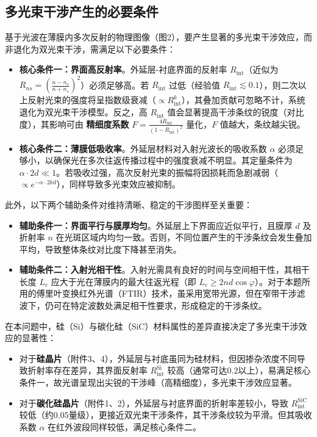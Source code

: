 \documentclass{ctexart} %
\begin{document}
\subsection{多光束干涉产生的必要条件}
基于光波在薄膜内多次反射的物理图像（图2），要产生显著的多光束干涉效应，而非退化为双光束干涉，需满足以下必要条件：

\begin{itemize}
    \item \textbf{核心条件一：界面高反射率}。外延层-衬底界面的反射率 $R_{\text{int}}$（近似为 $R_{ns} = \left( \frac{n - n_s}{n + n_s} \right)^2$）必须足够高。若 $R_{\text{int}}$ 过低（经验值 $R_{\text{int}} \lesssim 0.1$），则二次以上反射光束的强度将呈指数级衰减（$\propto R_{\text{int}}^k$），其叠加贡献可忽略不计，系统退化为双光束干涉模型。反之，高 $R_{\text{int}}$ 值会显著提高干涉条纹的锐度（对比度），其影响可由 \textbf{精细度系数} $F = \frac{4R_{\text{int}}}{(1-R_{\text{int}})^2}$ 量化，$F$ 值越大，条纹越尖锐。

    \item \textbf{核心条件二：薄膜低吸收率}。外延层材料对入射光波长的吸收系数 $\alpha$ 必须足够小，以确保光在多次往返传播过程中的强度衰减不明显。其定量条件为 $\alpha \cdot 2d \ll 1$。若吸收过强，高次反射光束的振幅将因损耗而急剧减弱（$\propto e^{-\alpha \cdot 2k d}$），同样导致多光束效应被抑制。
\end{itemize}

\noindent 此外，以下两个辅助条件对维持清晰、稳定的干涉图样至关重要：

\begin{itemize}
    \item \textbf{辅助条件一：界面平行与膜厚均匀}。外延层上下界面应近似平行，且膜厚 $d$ 及折射率 $n$ 在光斑区域内均匀一致。否则，不同位置产生的干涉条纹会发生叠加平均，导致整体条纹对比度下降甚至消失。

    \item \textbf{辅助条件二：入射光相干性}。入射光需具有良好的时间与空间相干性，其相干长度 $L_c$ 应大于光在薄膜内的最大往返光程（即 $L_c \geq 2nd\cos\varphi$）。对于本题所用的傅里叶变换红外光谱（FTIR）技术，虽采用宽带光源，但在窄带干涉滤波下，仍可在特定波数处满足相干性要求，形成稳定的干涉条纹。
\end{itemize}

\noindent 在本问题中，硅（Si）与碳化硅（SiC）材料属性的差异直接决定了多光束干涉效应的显著性：
\begin{itemize}
    \item 对于\textbf{硅晶片}（附件3、4），外延层与衬底虽同为硅材料，但因掺杂浓度不同导致折射率存在差异，其界面反射率 $R_{\text{int}}^{\text{Si}}$ 较高（通常可达$0.2$以上），易满足核心条件一，故光谱呈现出尖锐的干涉峰（高精细度），多光束干涉效应显著。
    \item 对于\textbf{碳化硅晶片}（附件1、2），外延层与衬底界面的折射率差较小，导致 $R_{\text{int}}^{\text{SiC}}$ 较低（约$0.05$量级），更接近双光束干涉条件，其干涉条纹较为平滑。但其吸收系数 $\alpha$ 在红外波段同样较低，满足核心条件二。
\end{itemize}
\end{document}

